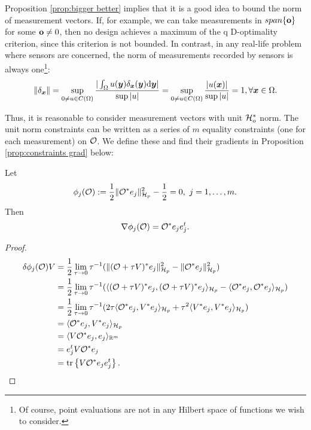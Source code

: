 Proposition \ref{prop:bigger better} implies that it is a good idea to
bound the norm of measurement vectors. If, for example, we can take
measurements in $span\{\mathbf{o}\}$ for some $\mathbf{o} \neq 0$, then no
design achieves a maximum of the q D-optimality criterion, since this
criterion is not bounded. In contrast, in any real-life problem where
sensors are concerned, the norm of measurements recorded by sensors is
always one\footnote{Of course, point evaluations are not in any
Hilbert space of functions we wish to consider.}:
\begin{align*}
  \| \delta_{\x} \| = \sup_{0 \neq u \in C(\Omega)} \frac{
    |\int_{\Omega}u(\y) \delta_{\x}(\y) \der \y| 
  }{
    \sup|u|}
  = \sup_{0 \neq u \in C(\Omega)} \frac{|u(\x)|}{ \sup|u|} = 1,
  \forall \x \in \Omega.
\end{align*}

Thus, it is reasonable to consider measurement vectors with unit
$\mathcal{H}_o^*$ norm. The unit norm constraints can be written as a series
of $m$ equality constraints (one for each measurement) on $\mathcal{O}$. We
define these and find their gradients in Proposition
\ref{prop:constraints grad} below:

\begin{proposition}\label{prop:constraints grad}
  Let
  \begin{align*}
    \phi_j(\obs) :=\frac12 \| \obs^* e_j\|_{\hilp}^2 - \frac12 = 0,\ j=1,\dots,m.
  \end{align*}
  Then
  \begin{equation*}
    \nabla \phi_j(\obs) = \obs^* e_je_j^t.
  \end{equation*}
\end{proposition}

\begin{proof}
  \begin{align*}
    \delta \phi_j(\obs)V  
    &= \frac12\lim_{\tau \to 0}\tau^{-1}
    ( \|(\obs + \tau V)^*e_j \|_{\hilp}^2 - \|\obs ^*e_j \|_{\hilp}^2  ) \\
    &= \frac12\lim_{\tau \to 0}\tau^{-1}
    ( \langle (\obs + \tau V)^*e_j, (\obs + \tau V)^*e_j \rangle_{\hilp} - 
    \langle \obs^*e_j, \obs^*e_j \rangle_{\hilp} ) \\
    &= \frac12\lim_{\tau \to 0}\tau^{-1}
    (2\tau \langle \obs^*e_j,V^*e_j \rangle_{\hilp} 
    +\tau^2 \langle V^*e_j, V^*e_j \rangle_{\hilp} ) \\
    &= \langle \obs^*e_j,V^*e_j \rangle_{\hilp} \\
    &= \langle V \obs^*e_j,e_j \rangle_{\R^m} \\
    &= e_j^t V \obs^* e_j \\
    &= \tr{V \obs^* e_je_j^t}.
  \end{align*}
\end{proof}


